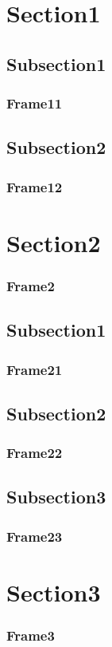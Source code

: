 \documentclass[10pt, xcolor=x11names,compress]{beamer}
\begin{document}
    
        \section{Section1}
        \subsection{Subsection1}
        \begin{frame}
            \frametitle{Frame11}
        \end{frame}

        \subsection{Subsection2}
        \begin{frame}
            \frametitle{Frame12}
        \end{frame}

        \section{Section2}
        \begin{frame}
            \frametitle{Frame2}
        \end{frame}

        \subsection{Subsection1}
        \begin{frame}
            \frametitle{Frame21}
        \end{frame}

        \subsection{Subsection2}
        \begin{frame}
            \frametitle{Frame22}
        \end{frame}

        \subsection{Subsection3}
        \begin{frame}
            \frametitle{Frame23}
        \end{frame}

        \section{Section3}
        \begin{frame}
            \frametitle{Frame3}
        \end{frame}

        \frame{}

    
\end{document}
